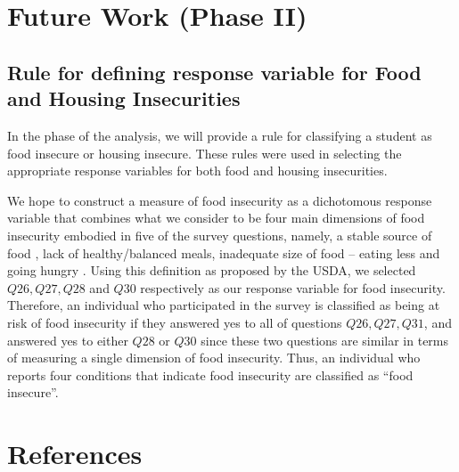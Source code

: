 \documentclass[
  10pt,
]{article}
\begin{document}
\hypertarget{future-work-phase-ii}{%
\section{Future Work (Phase II)}\label{future-work-phase-ii}}

\hypertarget{rule-for-defining-response-variable-for-food-and-housing-insecurities}{%
\subsection{Rule for defining response variable for Food and Housing Insecurities}\label{rule-for-defining-response-variable-for-food-and-housing-insecurities}}

In the phase of the analysis, we will provide a rule for classifying a student as food insecure or housing insecure. These rules were used in selecting the appropriate response variables for both food and housing insecurities.

We hope to construct a measure of food insecurity as a dichotomous response variable that combines what we consider to be four main dimensions of food insecurity embodied in five of the survey questions, namely, a stable source of food , lack of healthy/balanced meals, inadequate size of food -- eating less and going hungry . Using this definition as proposed by the USDA, we selected \(Q26, Q27, Q28\) and \(Q30\) respectively as our response variable for food insecurity. Therefore, an individual who participated in the survey is classified as being at risk of food insecurity if they answered yes to all of questions \(Q26, Q27, Q31\), and answered yes to either \(Q28\) or \(Q30\) since these two questions are similar in terms of measuring a single dimension of food insecurity. Thus, an individual who reports four conditions that indicate food insecurity are classified as ``food insecure''.

\hypertarget{references}{%
\section*{References}\label{references}}
\end{document}
